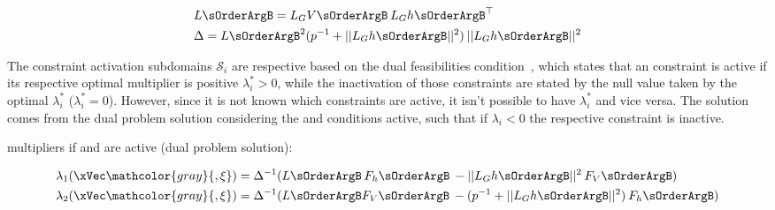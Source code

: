 \begin{align*}
    & L \sOrderArgB = L_GV \sOrderArgB \hspace{0.2em} L_Gh\sOrderArgB^{\top} \\
    & \Delta = L \sOrderArgB^2 (p^{-1} + ||L_Gh\sOrderArgB||^2)  \hspace{0.2em} || L_Gh\sOrderArgB||^2
\end{align*}


The constraint activation subdomains \(\mathcal{S}_i\) are respective  based on the dual feasibilities  condition~, which states that an constraint is active if its respective optimal  multiplier is positive \(\lambda_i^* > 0\), while the inactivation of those constraints are stated by the null value taken by the optimal \(\lambda_i^*\)  (\(\lambda_i^* = 0\)). However, since it is not known which constraints are active, it isn't possible to have \(\lambda_i^*\) and vice versa. The solution comes from the dual problem solution considering the  and  conditions active, such that if \(\lambda_i <0\) the respective constraint is inactive. 


 multipliers if  and  are active (dual problem solution):

\begin{align}
    & \lambda_1(\xVec \mathcolor{gray}{, \mathbf{\xi}}) = \Delta^{-1} (L \sOrderArgB \hspace{0.2em} F_h \sOrderArgB \hspace{0.2em} - ||L_Gh\sOrderArgB||^2  \hspace{0.2em}F_V \sOrderArgB)
    \notag\\
    & \lambda_2(\xVec \mathcolor{gray}{, \mathbf{\xi}}) = \Delta^{-1} (L \sOrderArgB F_V \sOrderArgB \hspace{0.2em} - (p^{-1} + ||L_Gh\sOrderArgB||^2)  \hspace{0.2em}F_h \sOrderArgB) 
    \label{eq:KKT-Multipliers_formulas}
\end{align}


